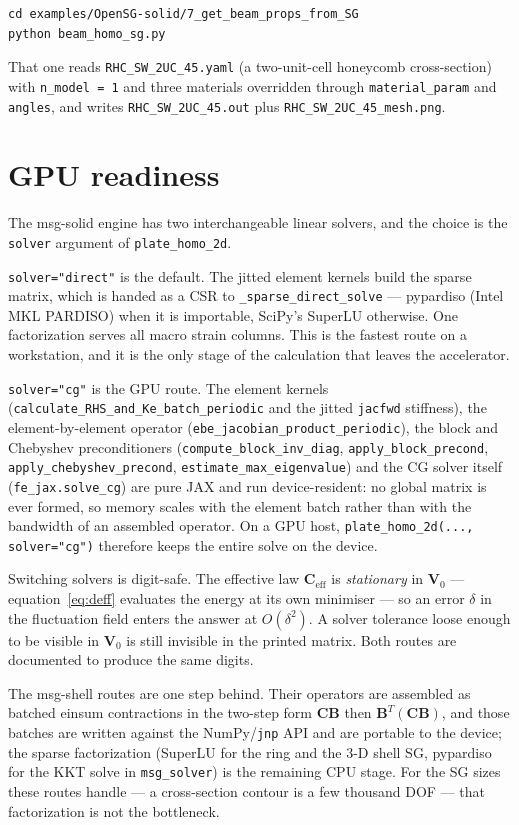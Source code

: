 \begin{lstlisting}[style=shellst]
cd examples/OpenSG-solid/7_get_beam_props_from_SG
python beam_homo_sg.py
\end{lstlisting}

\noindent
That one reads \texttt{RHC\_SW\_2UC\_45.yaml} (a two-unit-cell honeycomb
cross-section) with \texttt{n\_model = 1} and three materials overridden through
\texttt{material\_param} and \texttt{angles}, and writes
\texttt{RHC\_SW\_2UC\_45.out} plus \texttt{RHC\_SW\_2UC\_45\_mesh.png}.

\section{GPU readiness}
\label{sec:gpu}

The msg-solid engine has two interchangeable linear solvers, and the choice is
the \texttt{solver} argument of \texttt{plate\_homo\_2d}.

\texttt{solver="direct"} is the default. The jitted element kernels build the
sparse matrix, which is handed as a CSR to \texttt{\_sparse\_direct\_solve} ---
pypardiso (Intel MKL PARDISO) when it is importable, SciPy's SuperLU otherwise.
One factorization serves all macro strain columns. This is the fastest route on
a workstation, and it is the only stage of the calculation that leaves the
accelerator.

\texttt{solver="cg"} is the GPU route. The element kernels
(\texttt{calculate\_RHS\_and\_Ke\_batch\_periodic} and the jitted
\texttt{jacfwd} stiffness), the element-by-element operator
(\texttt{ebe\_jacobian\_product\_periodic}), the block and Chebyshev
preconditioners (\texttt{compute\_block\_inv\_diag},
\texttt{apply\_block\_precond}, \texttt{apply\_chebyshev\_precond},
\texttt{estimate\_max\_eigenvalue}) and the CG solver itself
(\texttt{fe\_jax.solve\_cg}) are pure JAX and run device-resident: no global
matrix is ever formed, so memory scales with the element batch rather than with
the bandwidth of an assembled operator. On a GPU host,
\texttt{plate\_homo\_2d(..., solver="cg")} therefore keeps the entire solve on
the device.

Switching solvers is digit-safe. The effective law
$\mathbf{C}_{\mathrm{eff}}$ is \emph{stationary} in $\mathbf{V}_0$ ---
equation~\eqref{eq:deff} evaluates the energy at its own minimiser --- so an
error $\delta$ in the fluctuation field enters the answer at
$O(\delta^2)$. A solver tolerance loose enough to be visible in $\mathbf{V}_0$
is still invisible in the printed matrix. Both routes are documented to produce
the same digits.

The msg-shell routes are one step behind. Their operators are assembled as
batched einsum contractions in the two-step form
$\mathbf{C}\mathbf{B}$ then $\mathbf{B}^{T}(\mathbf{C}\mathbf{B})$, and those
batches are written against the NumPy/\texttt{jnp} API and are portable to the
device; the sparse factorization (SuperLU for the ring and the 3-D shell SG,
pypardiso for the KKT solve in \texttt{msg\_solver}) is the remaining CPU stage.
For the SG sizes these routes handle --- a cross-section contour is a few
thousand DOF --- that factorization is not the bottleneck.
